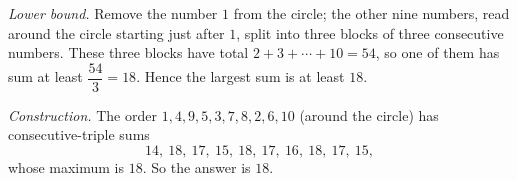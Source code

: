 \emph{Lower bound.} Remove the number $1$ from the circle; the other nine numbers, read around the circle starting just after $1$, split into three blocks of three consecutive numbers. These three blocks have total $2+3+\cdots+10=54$, so one of them has sum at least $\dfrac{54}{3}=18$. Hence the largest sum is at least $18$.

\emph{Construction.} The order $1,4,9,5,3,7,8,2,6,10$ (around the circle) has consecutive-triple sums
\[14,\ 18,\ 17,\ 15,\ 18,\ 17,\ 16,\ 18,\ 17,\ 15,\]
whose maximum is $18$. So the answer is $\boxed{18}$.
